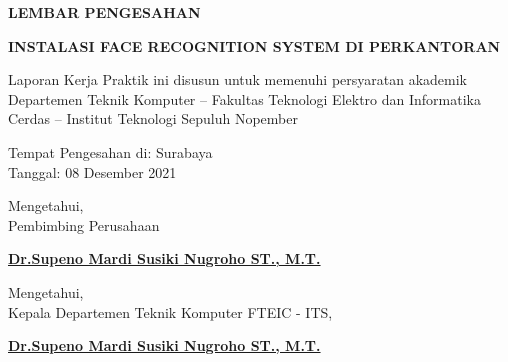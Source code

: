 \begin{center}
  {\Large \textbf{LEMBAR PENGESAHAN}}
  \vspace{6ex}


  {\large \textbf{INSTALASI FACE RECOGNITION SYSTEM DI PERKANTORAN}}
  \vspace{6ex}

  Laporan Kerja Praktik ini disusun untuk memenuhi persyaratan akademik Departemen Teknik Komputer – Fakultas Teknologi Elektro dan Informatika Cerdas – Institut Teknologi Sepuluh Nopember
  \vspace{2ex}

  Tempat Pengesahan di: Surabaya \\
  Tanggal: 08 Desember 2021
  \vspace{8ex}

  Mengetahui, \\
  Pembimbing Perusahaan
  \vspace{12ex}

  \textbf{\underline{Dr.Supeno Mardi Susiki Nugroho ST., M.T.}}
  \vspace{8ex}

  Mengetahui, \\
  Kepala Departemen Teknik Komputer FTEIC - ITS,
  \vspace{12ex}

  \textbf{\underline{Dr.Supeno Mardi Susiki Nugroho ST., M.T.}}

\end{center}
